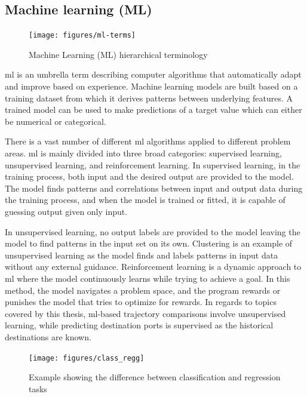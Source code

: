 \subsection{Machine learning (ML)}
\label{sec:machine_learning}

\begin{figure}[htbp]  %
    \centering
    \texttt{[image: figures/ml-terms]}
    \caption{Machine Learning (ML) hierarchical terminology}
    \label{fig:ml_terms}
\end{figure}

\acrfull{ml} is an umbrella term describing computer algorithms that automatically adapt and improve based on experience. Machine learning models are built based on a training dataset from which it derives patterns between underlying features. A trained model can be used to make predictions of a target value which can either be numerical or categorical.

There is a vast number of different \acrshort{ml} algorithms applied to different problem areas. \acrshort{ml} is mainly divided into three broad categories: supervised learning, unsupervised learning, and reinforcement learning. In supervised learning, in the training process, both input and the desired output are provided to the model. The model finds patterns and correlations between input and output data during the training process, and when the model is trained or fitted, it is capable of guessing output given only input.

In unsupervised learning, no output labels are provided to the model leaving the model to find patterns in the input set on its own. Clustering is an example of unsupervised learning as the model finds and labels patterns in input data without any external guidance. Reinforcement learning is a dynamic approach to \acrshort{ml} where the model continuously learns while trying to achieve a goal. In this method, the model navigates a problem space, and the program rewards or punishes the model that tries to optimize for rewards. In regards to topics covered by this thesis, \acrshort{ml}-based trajectory comparisons involve unsupervised learning, while predicting destination ports is supervised as the historical destinations are known.

\begin{figure}[htbp]  %
    \centering
    \texttt{[image: figures/class\_regg]}
    \caption{Example showing the difference between classification and regression tasks}
    \label{fig:classification_regression}
\end{figure}

